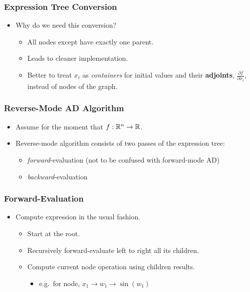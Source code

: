 \begin{frame}
\frametitle{Expression Tree Conversion}

\begin{itemize}

\item{Why do we need this conversion?}
    \begin{itemize}
        \item All nodes except  have exactly one parent.
        \item Leads to cleaner implementation.
        \item Better to treat $x_i$ as \emph{containers} for
            initial values and their \textbf{adjoints}, $\frac{\partial f}{\partial x_i}$,
            instead of nodes of the graph.
    \end{itemize}

\end{itemize}
\end{frame}

\begin{frame}
\frametitle{Reverse-Mode AD Algorithm}
\begin{itemize}

\item Assume for the moment that $f: \mathbb{R}^n \to \mathbb{R}$.

\item Reverse-mode algorithm consists of two passes of the expression tree:
    \begin{itemize}
        \item \emph{forward}-evaluation (not to be confused with forward-mode AD)
        \item \emph{backward}-evaluation
    \end{itemize}

\end{itemize}
\end{frame}

\begin{frame}
\frametitle{Forward-Evaluation}
\begin{itemize}

\item Compute expression in the usual fashion.
    \begin{itemize}
        \item Start at the root.
        \item Recursively forward-evaluate left to right all its children.
        \item Compute current node operation using children results.
            \begin{itemize}
                \item e.g.\ for  node, $x_1 \to w_1 \to \sin(w_1)$
            \end{itemize}
    \end{itemize}

\end{itemize}
\end{frame}

